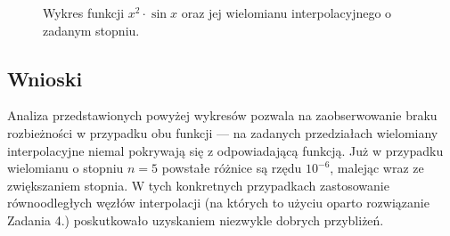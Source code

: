 \documentclass{classrep}
\begin{document}
		\begin{figure}[!h]
			\centering
			 \hfill
			 \hfill
  			\caption{Wykres funkcji $x^2 \cdot \sin{x}$ oraz jej wielomianu interpolacyjnego o zadanym stopniu.}
  			\label{fig:2}
		\end{figure}	
		
	\subsection{Wnioski}
		Analiza przedstawionych powyżej wykresów pozwala na zaobserwowanie braku rozbieżności w przypadku obu funkcji --- na zadanych przedziałach wielomiany interpolacyjne niemal pokrywają się z odpowiadającą funkcją. Już w przypadku wielomianu o stopniu $n=5$ powstałe różnice są rzędu $10^{-6}$, malejąc wraz ze zwiększaniem stopnia. W tych konkretnych przypadkach zastosowanie równoodległych węzłów interpolacji (na których to użyciu oparto rozwiązanie Zadania 4.) poskutkowało uzyskaniem niezwykle dobrych przybliżeń.
	
\end{document}
